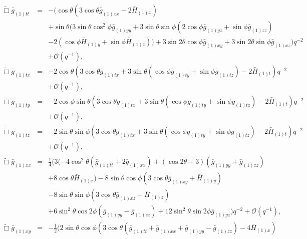 \documentclass[a4paper,11pt]{article}
\numberwithin{equation}{section}
\begin{document}
\begin{eqnarray}\label{eqn:efett}
\tilde{\Box}\bar{g}_{(1)tt}&=&-(\cos \theta (3 \cos \theta \bar{g}_{(1)xx}-2 \bar{H}_{(1)x}) \nonumber \\
&&+\sin\theta (3 \sin \theta \cos^2\phi \bar{g}_{(1) yy}+3
  \sin \theta \sin \phi (2 \cos \phi \bar{g}_{(1) yz}+\sin\phi
  \bar{g}_{(1) zz}) \nonumber \\
  &&-2 (\cos \phi \bar{H}_{(1) y}+\sin\phi
  \bar{H}_{(1) z}))+3 \sin 2 \theta \cos \phi \bar{g}_{(1) xy}+3
  \sin 2 \theta \sin \phi \bar{g}_{(1) xz})q^{-2} \nonumber \\
&&+\mathcal{O}(q^{-1}),\\
%
\label{eqn:efetx}
\tilde{\Box}\bar{g}_{(1)tx}&=&-2 \cos \theta (3 \cos\theta \bar{g}_{(1) tx}+3 \sin \theta
  (\cos \phi \bar{g}_{(1) ty}+\sin \phi \bar{g}_{(1)tz})-2
  \bar{H}_{(1) t})  q^{-2} \nonumber \\
&&+\mathcal{O}(q^{-1}),\\
%
\label{eqn:efety}
\tilde{\Box}\bar{g}_{(1)ty}&=&-2 \cos \phi \sin\theta (3 \cos\theta \bar{g}_{(1) tx}+3 \sin \theta
  (\cos \phi \bar{g}_{(1) ty}+\sin \phi \bar{g}_{(1)tz})-2
  \bar{H}_{(1) t})  q^{-2} \nonumber \\
&&+\mathcal{O}(q^{-1}),\\
%
\label{eqn:efetz}
\tilde{\Box}\bar{g}_{(1)tz}&=&-2 \sin \theta \sin\phi (3 \cos\theta \bar{g}_{(1) tx}+3 \sin \theta
  (\cos \phi \bar{g}_{(1) ty}+\sin \phi \bar{g}_{(1)tz})-2
  \bar{H}_{(1) t})  q^{-2} \nonumber \\
&&+\mathcal{O}(q^{-1}),\\
%
\label{eqn:efexx}
\tilde{\Box}\bar{g}_{(1)xx}&=&\frac{1}{4} (3 (-4 \cos ^2\theta (\bar{g}_{(1) tt}+2 \bar{g}_{(1)
  xx})+(\cos 2 \theta +3) (\bar{g}_{(1) yy}+\bar{g}_{(1)
zz}) \nonumber \\
&&+8 \cos \theta \bar{H}_{(1) x})-8 \sin \theta \cos \phi 
  (3 \cos \theta \bar{g}_{(1)xy}+\bar{H}_{(1) y}) \nonumber \\
  &&-8 \sin\theta \sin\phi (3 \cos\theta \bar{g}_{(1) xz}+\bar{H}_{(1) z}) \nonumber \\
  &&+6 \sin^2\theta \cos 2 \phi (\bar{g}_{(1)yy}-\bar{g}_{(1)zz})+12
  \sin^2\theta \sin 2 \phi \bar{g}_{(1) yz})  q^{-2} +\mathcal{O}(q^{-1}),\\
%
\label{eqn:efexy}
\tilde{\Box}\bar{g}_{(1)xy}&=&-\frac{1}{2} (2 \sin \theta \cos \phi (3 \cos \theta (\bar{g}_{(1)tt}+\bar{g}_{(1)xx}+\bar{g}_{(1)yy}-\bar{g}_{(1)zz})-4 \bar{H}_{(1) x}) \nonumber \\

\end{eqnarray}
\end{document}
